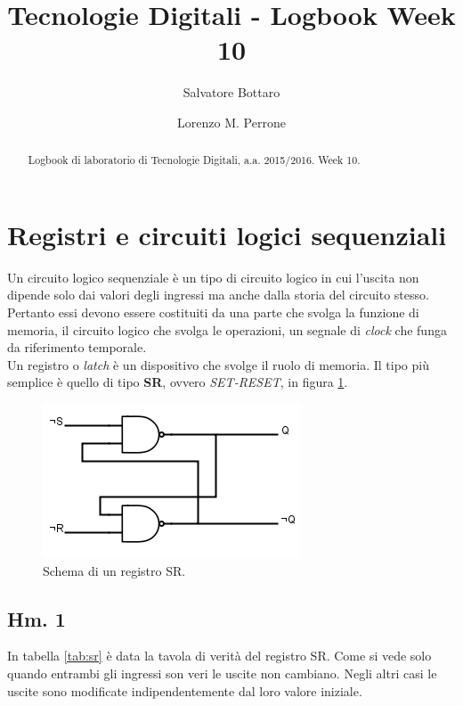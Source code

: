 \documentclass[journal, a4paper]{IEEEtran}
\begin{document}
	\title{Tecnologie Digitali - Logbook Week 10}
	\author[1]{Salvatore Bottaro}
		\author[2]{Lorenzo M. Perrone}
	\maketitle
	
\begin{abstract}
	Logbook di laboratorio di Tecnologie Digitali, a.a. 2015/2016. Week 10.
\end{abstract}

\section{Registri e circuiti logici sequenziali}

Un circuito logico sequenziale è un tipo di circuito logico in cui l'uscita non dipende solo dai valori degli ingressi ma anche dalla storia del circuito stesso. Pertanto essi devono essere costituiti da una parte che svolga la funzione di memoria, il circuito logico che svolga le operazioni, un segnale di \textit{clock} che funga da riferimento temporale.\\
Un registro o \textit{latch} è un dispositivo che svolge il ruolo di memoria. Il tipo più semplice è quello di tipo \textbf{SR}, ovvero \textit{SET-RESET}, in figura \ref{fig:sr}.

\begin{figure}[htp]
\centering
\includegraphics[scale=.5]{SR}
\caption{Schema di un registro SR.}
\label{fig:sr}
\end{figure}

\subsection{Hm. 1}

In tabella \ref{tab:sr} è data la tavola di verità del registro SR. Come si vede solo quando entrambi gli ingressi son veri le uscite non cambiano. Negli altri casi le uscite sono modificate indipendentemente dal loro valore iniziale.
\end{document}
